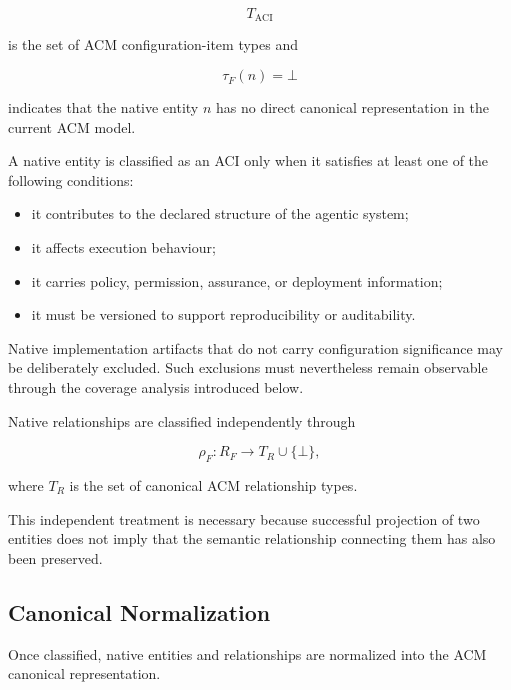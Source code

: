 \documentclass[10pt]{article}
\begin{document}
\begin{equation}
	T_{\mathrm{ACI}}
\end{equation}

is the set of ACM configuration-item types and

\begin{equation}
	\tau_F(n)=\bot
\end{equation}

indicates that the native entity $n$ has no direct canonical representation in
the current ACM model.

A native entity is classified as an ACI only when it satisfies at least one of
the following conditions:

\begin{itemize}
	\item it contributes to the declared structure of the agentic system;
	\item it affects execution behaviour;
	\item it carries policy, permission, assurance, or deployment information;
	\item it must be versioned to support reproducibility or auditability.
\end{itemize}

Native implementation artifacts that do not carry configuration significance
may be deliberately excluded. Such exclusions must nevertheless remain
observable through the coverage analysis introduced below.

Native relationships are classified independently through

\begin{equation}
	\rho_F :
	R_F
	\rightarrow
	T_R
	\cup
	\{\bot\},
\end{equation}

where $T_R$ is the set of canonical ACM relationship types.

This independent treatment is necessary because successful projection of two
entities does not imply that the semantic relationship connecting them has also
been preserved.

\subsection{Canonical Normalization}

Once classified, native entities and relationships are normalized into the ACM
canonical representation.
\end{document}
